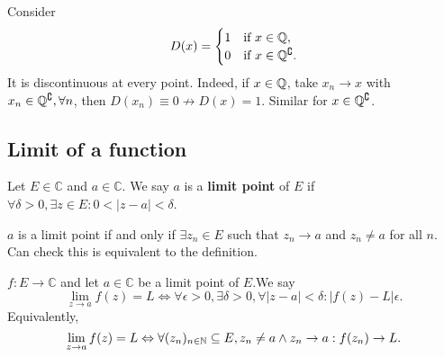 \begin{example}
    Consider 
    \[
        D(x) = \begin{cases}
        1 &\text{if }x\in \mathbb{Q}, \\
        0 &\text{if }x\in {\mathbb{Q}}^\complement.\\
        \end{cases} 
    \]
    It is discontinuous at every point. Indeed, if $x\in {\mathbb{Q}}$, take $x_n\to x$ with $ x_n\in {\mathbb{Q}}^\complement,\forall n $, then $ D(x_n)\equiv 0 \nrightarrow D(x)=1 $. Similar for $ x\in {\mathbb{Q}}^\complement $.
\end{example}

\subsection{Limit of a function}
\begin{definition}
    Let $ E\in \mathbb{C} $ and $ a\in \mathbb{C} $. We say $a$ is a \textbf{limit point} of $E$ if $ \forall \delta>0, \exists z\in E: 0<\left| z-a \right| <\delta $.
    \begin{center}
    \end{center}
\end{definition}
\begin{remark}
    $a$ is a limit point if and only if $ \exists z_n\in E $ such that $ z_n\to a $ and $ z_n\neq a $ for all $n$. Can check this is equivalent to the definition.
\end{remark}

\begin{definition}
    $ f:E\to \mathbb{C} $ and let $ a\in \mathbb{C} $ be a limit point of $E$.We say 
    \[
        \lim_{z \to a} f(z) = L \Longleftrightarrow \forall \epsilon>0, \exists \delta>0, \forall \left| z-a \right| <\delta: \left| f(z)-L \right| \epsilon.
    \]
    Equivalently,
    \[
        \lim_{z \to a} f(z)=L \Leftrightarrow \forall (z_n)_{n\in{\mathbb{N}}} \subseteq E, z_n\neq a \land z_n\to a: f(z_n)\to L.
    \]
\end{definition}

